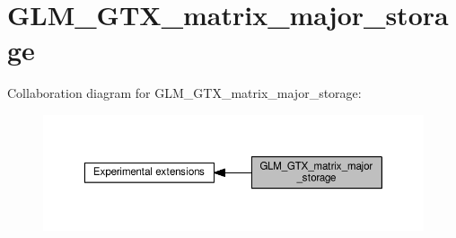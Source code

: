 \hypertarget{group__gtx__matrix__major__storage}{}\section{G\+L\+M\+\_\+\+G\+T\+X\+\_\+matrix\+\_\+major\+\_\+storage}
\label{group__gtx__matrix__major__storage}
Collaboration diagram for G\+L\+M\+\_\+\+G\+T\+X\+\_\+matrix\+\_\+major\+\_\+storage\+:
\nopagebreak
\begin{figure}[H]
\begin{center}
\leavevmode
\includegraphics[width=350pt]{dc/daf/group__gtx__matrix__major__storage}
\end{center}
\end{figure}
